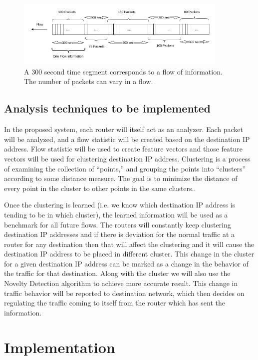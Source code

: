 \documentclass[12pt,oneside,a4paper]{article}
\begin{document}
\begin{figure}[H]
\centering
\includegraphics[width=0.90\textwidth]{Data_Flow_Capture.png}
\caption{A 300 second time segment corresponds to a flow of information. The number of packets can vary in a flow.} \label{fig:flow}
\end{figure}

\subsection{Analysis techniques to be implemented}
In the proposed system, each router will itself act as an analyzer. Each packet will be analyzed, and a flow statistic will be created based on the destination IP address. Flow statistic will be used to create feature vectors and those feature vectors will be used for clustering destination IP address. Clustering is a process of examining the collection of “points,” and grouping the points into “clusters” according to some distance measure. The goal is to minimize the distance of every point in the cluster to other points in the same clusters.\cite{machine-learning}.

Once the clustering is learned (i.e. we know which destination IP address is tending to be in which cluster), the learned information will be used as a benchmark for all future flows. The routers will constantly keep clustering destination IP addresses and if there is deviation for the normal traffic at a router for any destination then that will affect the clustering and it will cause the destination IP address to be placed in different cluster. This change in the cluster for a given destination IP address can be marked as a change in the behavior of the traffic for that destination. Along with the cluster we will also use the Novelty Detection algorithm to achieve more accurate result. This change in traffic behavior will be reported to destination network, which then decides on regulating the traffic coming to itself from the router which has sent the information.
\pagebreak
\section{Implementation} \label{sec:Implementation}
\end{document}
